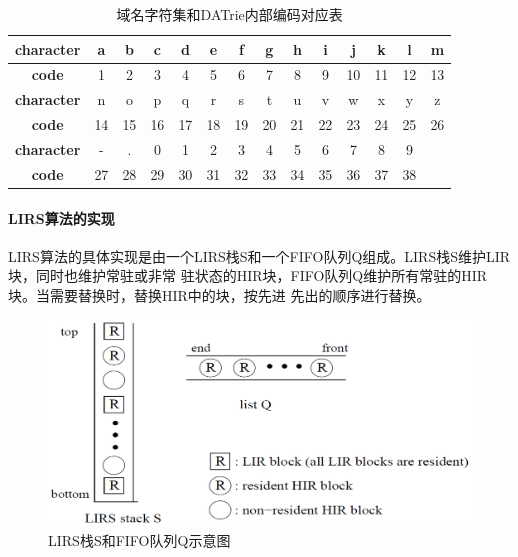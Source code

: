 \begin{table}[H]
\centering
\begin{tabular}{*{14}{|c}|}
\hline
\textbf{character}&a&b&c&d&e&f&g&h&i&j&k&l&m\\
\hline
\textbf{code}&1&2&3&4&5&6&7&8&9&10&11&12&13\\
\hline
\textbf{character}&n&o&p&q&r&s&t&u&v&w&x&y&z\\
\hline
\textbf{code}&14&15&16&17&18&19&20&21&22&23&24&25&26\\
\hline
\textbf{character}&-&.&0&1&2&3&4&5&6&7&8&9\\
\textbf{code}&27&28&29&30&31&32&33&34&35&36&37&38\\
\end{tabular}
\caption{域名字符集和DATrie内部编码对应表}
\end{table}


\paragraph{LIRS算法的实现\\[5pt]}
LIRS算法的具体实现是由一个LIRS栈S和一个FIFO队列Q组成。LIRS栈S维护LIR块，同时也维护常驻或非常
驻状态的HIR块，FIFO队列Q维护所有常驻的HIR块。当需要替换时，替换HIR中的块，按先进
先出的顺序进行替换。
\begin{figure}[H]
\centering
\includegraphics[keepaspectratio, scale=0.4]{pitures/lirsstack.png}
\caption{LIRS栈S和FIFO队列Q示意图} 
\end{figure}


